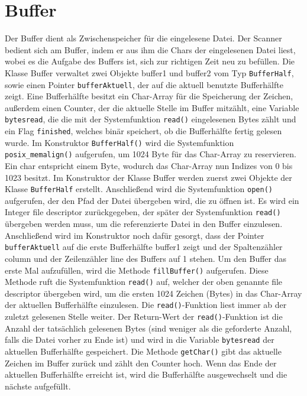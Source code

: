 \documentclass[a4paper,11pt]{report}
\begin{document}
\section{Buffer}
Der Buffer dient als Zwischenspeicher für die eingelesene Datei.
Der Scanner bedient sich am Buffer, indem er aus ihm die Chars der eingelesenen Datei liest, wobei es die Aufgabe des Buffers ist, sich zur richtigen Zeit neu zu befüllen.
Die Klasse Buffer verwaltet zwei Objekte buffer1 und buffer2 vom Typ \texttt{BufferHalf}, sowie einen Pointer \texttt{bufferAktuell}, der auf die aktuell benutzte Bufferhälfte zeigt.
Eine Bufferhälfte besitzt ein Char-Array für die Speicherung der Zeichen, außerdem einen Counter, der die aktuelle Stelle im Buffer mitzählt, eine Variable \texttt{bytesread}, die die mit der Systemfunktion \texttt{read()} eingelesenen Bytes zählt und ein Flag \texttt{finished}, welches binär speichert, ob die Bufferhälfte fertig gelesen wurde.
Im Konstruktor \texttt{BufferHalf()} wird die Systemfunktion \texttt{posix\_memalign()} aufgerufen, um 1024 Byte für das Char-Array zu reservieren.
Ein char entspricht einem Byte, wodurch das Char-Array nun Indizes von 0 bis 1023 besitzt.
Im Konstruktor der Klasse Buffer werden zuerst zwei Objekte der Klasse \texttt{BufferHalf} erstellt.
Anschließend wird die Systemfunktion \texttt{open()} aufgerufen, der den Pfad der Datei übergeben wird, die zu öffnen ist.
Es wird ein Integer file descriptor zurückgegeben, der später der Systemfunktion \texttt{read()} übergeben werden muss, um die referenzierte Datei in den Buffer einzulesen.
Anschließend wird im Konstruktor noch dafür gesorgt, dass der Pointer \texttt{bufferAktuell} auf die erste Bufferhälfte buffer1 zeigt und der Spaltenzähler column und der Zeilenzähler line des Buffers auf 1 stehen.
Um den Buffer das erste Mal aufzufüllen, wird die Methode \texttt{fillBuffer()} aufgerufen.
Diese Methode ruft die Systemfunktion \texttt{read()} auf, welcher der oben genannte file descriptor übergeben wird, um die ersten 1024 Zeichen (Bytes) in das Char-Array der aktuellen Bufferhälfte einzulesen.
Die \texttt{read()}-Funktion liest immer ab der zuletzt gelesenen Stelle weiter.
Der Return-Wert der \texttt{read()}-Funktion ist die Anzahl der tatsächlich gelesenen Bytes (sind weniger als die geforderte Anzahl, falls die Datei vorher zu Ende ist) und wird in die Variable \texttt{bytesread} der aktuellen Bufferhälfte gespeichert.
Die Methode \texttt{getChar()} gibt das aktuelle Zeichen im Buffer zurück und zählt den Counter hoch.
Wenn das Ende der aktuellen Bufferhälfte erreicht ist, wird die Bufferhälfte ausgewechselt und die nächste aufgefüllt.
\end{document}
